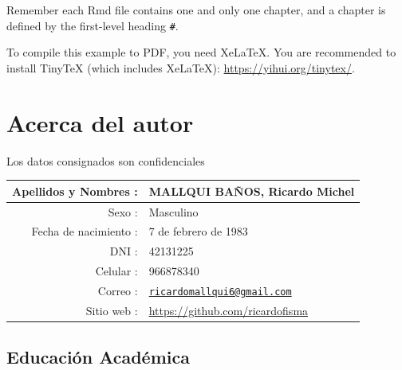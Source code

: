\documentclass[]{krantz}
\begin{document}
Remember each Rmd file contains one and only one chapter, and a chapter is defined by the first-level heading \texttt{\#}.

To compile this example to PDF, you need XeLaTeX. You are recommended to install TinyTeX (which includes XeLaTeX): \url{https://yihui.org/tinytex/}.

\hypertarget{acerca-del-autor}{%
\chapter*{Acerca del autor}\label{acerca-del-autor}}

Los datos consignados son confidenciales

\begin{longtable}[]{@{}rl@{}}
\toprule
Apellidos y Nombres : & MALLQUI BAÑOS, Ricardo Michel\tabularnewline
\midrule
\endhead
Sexo : & Masculino\tabularnewline
Fecha de nacimiento : & 7 de febrero de 1983\tabularnewline
DNI : & 42131225\tabularnewline
Celular : & 966878340\tabularnewline
Correo : & \href{mailto:ricardomallqui6@gmail.com}{\nolinkurl{ricardomallqui6@gmail.com}}\tabularnewline
Sitio web : & \url{https://github.com/ricardofisma}\tabularnewline
\bottomrule
\end{longtable}

\hypertarget{educaciuxf3n-acaduxe9mica}{%
\section*{Educación Académica}\label{educaciuxf3n-acaduxe9mica}}
\end{document}
